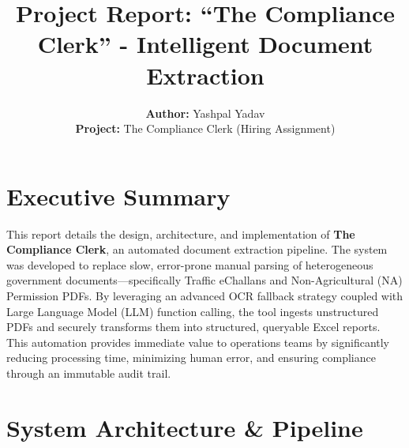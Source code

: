 \documentclass[11pt]{article}
\title{\textbf{Project Report: ``The Compliance Clerk'' - Intelligent Document Extraction}}
\author{\textbf{Author:} Yashpal Yadav \\ \textbf{Project:} The Compliance Clerk (Hiring Assignment)}
\date{}
\begin{document}
\maketitle

\section{Executive Summary}
This report details the design, architecture, and implementation of \textbf{The Compliance Clerk}, an automated document extraction pipeline. The system was developed to replace slow, error-prone manual parsing of heterogeneous government documents---specifically Traffic eChallans and Non-Agricultural (NA) Permission PDFs. By leveraging an advanced OCR fallback strategy coupled with Large Language Model (LLM) function calling, the tool ingests unstructured PDFs and securely transforms them into structured, queryable Excel reports. This automation provides immediate value to operations teams by significantly reducing processing time, minimizing human error, and ensuring compliance through an immutable audit trail.

\section{System Architecture \& Pipeline}

\begin{center}
\end{center}
\end{document}
